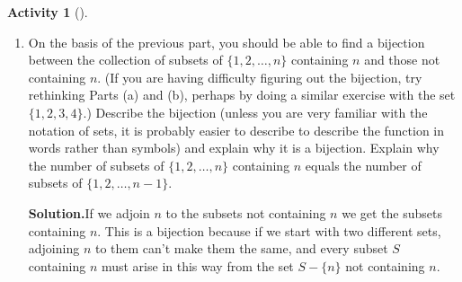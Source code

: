\documentclass[10pt,]{book}
\theoremstyle{plain}
\theoremstyle{definition}
\newtheorem{activity}[project]{Activity}
\numberwithin{equation}{chapter}
\begin{document}
\begin{activity}[]
\begin{enumerate}[label=(\alph*)]
~\par
\item On the basis of the previous part, you should be able to find a bijection between the collection of subsets of \(\{1, 2, \ldots , n \}\) containing \(n\) and those not containing \(n\). (If you are having difficulty figuring out the bijection, try rethinking Parts (a) and (b), perhaps by doing a similar exercise with the set \(\{1,2,3,4\}\).) Describe the bijection (unless you are very familiar with the notation of sets, it is probably easier to describe to describe the function in words rather than symbols) and explain why it is a bijection. Explain why the number of subsets of \(\{ 1, 2, \ldots , n \}\) containing \(n\) equals the number of subsets of \(\{ 1, 2, \ldots, n-1 \}\).%
\par\medskip\noindent%
\textbf{Solution.}\quad If we adjoin \(n\) to the subsets not containing \(n\) we get the subsets containing \(n\). This is a bijection because if we start with two different sets, adjoining \(n\) to them can't make them the same, and every subset \(S\) containing \(n\) must arise in this way from the set \(S-\{n\}\) not containing \(n\).%


\end{enumerate}
\end{activity}
\end{document}
